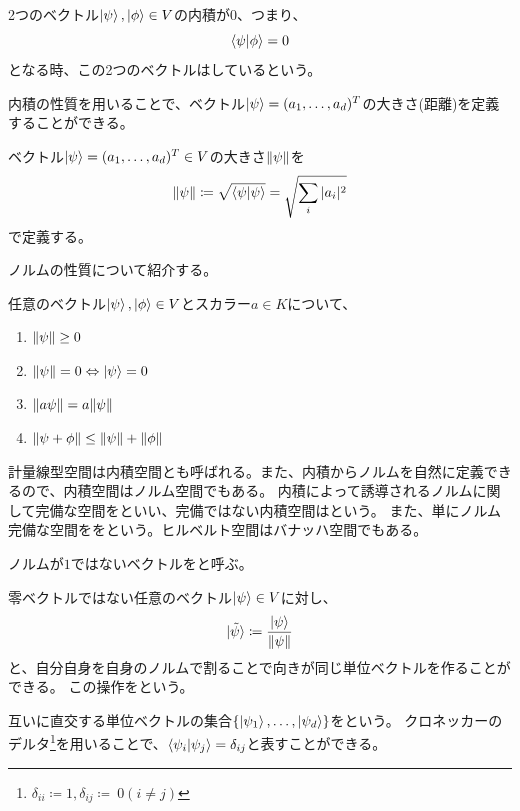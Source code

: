 \begin{Def}
  2つのベクトル$\ket{\psi},\ket{\phi} \in V$の内積が0、つまり、
  $$
  \braket{\psi|\phi} = 0
  $$
  となる時、この2つのベクトルはしているという。
\end{Def}


内積の性質を用いることで、ベクトル$\ket{\psi} = (a_1,\ldots,a_d)^T$の大きさ(距離)を定義することができる。
\begin{Def}
  ベクトル$\ket{\psi} = (a_1,\ldots,a_d)^T \in V$の大きさ$\|\psi\|$を
  $$
  \|\psi\| \coloneqq \sqrt{\braket{\psi|\psi}} = \sqrt{\sum_i|a_i|^2}
  $$
  で定義する。
\end{Def}
ノルムの性質について紹介する。
\begin{Prop}
  任意のベクトル$\ket{\psi},\ket{\phi}\in V$とスカラー$a\in K$について、
  \begin{enumerate}
    \item $\|\psi\| \geq 0$
    \item $\|\psi\| = 0 \Leftrightarrow \ket{\psi} = 0$
    \item $\|a\psi\| = a\|\psi\|$
    \item $\|\psi + \phi\| \leq \|\psi\| + \|\phi\|$
  \end{enumerate}
\end{Prop}

計量線型空間は内積空間とも呼ばれる。また、内積からノルムを自然に定義できるので、内積空間はノルム空間でもある。
内積によって誘導されるノルムに関して完備な空間をといい、完備ではない内積空間はという。
また、単にノルム完備な空間ををという。ヒルベルト空間はバナッハ空間でもある。

ノルムが$1$ではないベクトルをと呼ぶ。
\begin{Def}
  零ベクトルではない任意のベクトル$\ket{\psi} \in V$に対し、
  $$
  \ket{\tilde{\psi}} \coloneqq \frac{\ket{\psi}}{\|\psi\|}
  $$
  と、自分自身を自身のノルムで割ることで向きが同じ単位ベクトルを作ることができる。
  この操作をという。
\end{Def}

\begin{Def}
  互いに直交する単位ベクトルの集合$\{\ket{\psi_1},\ldots,\ket{\psi_d}\}$をという。
  クロネッカーのデルタ\footnote{$\delta_{ii} \coloneqq 1, \delta_{ij} \coloneqq ~0(i\neq j)$}を用いることで、$\braket{\psi_i|\psi_j} = \delta_{ij}$と表すことができる。
\end{Def}

